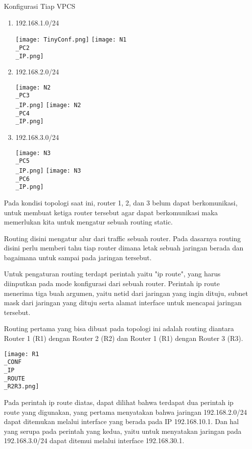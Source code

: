\documentclass[12pt, a4paper]{article}
\begin{document}
  Konfigurasi Tiap VPCS

  \begin{enumerate}
    \item 192.168.1.0/24
      \begin{center}
        \texttt{[image: TinyConf.png]}
        \texttt{[image: N1\\\_PC2\\\_IP.png]}
      \end{center}

    \item 192.168.2.0/24
      \begin{center}
        \texttt{[image: N2\\\_PC3\\\_IP.png]}
        \texttt{[image: N2\\\_PC4\\\_IP.png]}
      \end{center}

    \item 192.168.3.0/24
      \begin{center}
        \texttt{[image: N3\\\_PC5\\\_IP.png]}
        \texttt{[image: N3\\\_PC6\\\_IP.png]}
      \end{center}
  \end{enumerate}

  Pada kondisi topologi saat ini, router 1, 2, dan 3 belum dapat
  berkomunikasi, untuk membuat ketiga router tersebut agar dapat berkomunikasi
  maka memerlukan kita untuk mengatur sebuah routing static.

  Routing disini mengatur alur dari traffic sebuah router. Pada dasarnya routing
  disini perlu memberi tahu tiap router dimana letak sebuah jaringan berada dan
  bagaimana untuk sampai pada jaringan tersebut.

  Untuk pengaturan routing terdapt perintah yaitu "ip route", yang harus diinputkan
  pada mode konfigurasi dari sebuah router. Perintah ip route menerima
  tiga buah argumen, yaitu netid dari jaringan yang ingin dituju, subnet
  mask dari jaringan yang dituju serta alamat interface untuk mencapai jaringan
  tersebut.

  Routing pertama yang bisa dibuat pada topologi ini adalah routing diantara
  Router 1 (R1) dengan Router 2 (R2) dan Router 1 (R1) dengan Router 3 (R3).

  \begin{center}
    \texttt{[image: R1\\\_CONF\\\_IP\\\_ROUTE\\\_R2R3.png]}
  \end{center}

  Pada perintah ip route diatas, dapat dilihat bahwa terdapat dua perintah
  ip route yang digunakan, yang pertama menyatakan bahwa jaringan
  192.168.2.0/24 dapat ditemukan melalui interface yang berada pada IP
  192.168.10.1. Dan hal yang serupa pada perintah yang kedua, yaitu
  untuk menyatakan jaringan pada 192.168.3.0/24 dapat ditemui melalui
  interface 192.168.30.1.
\end{document}
